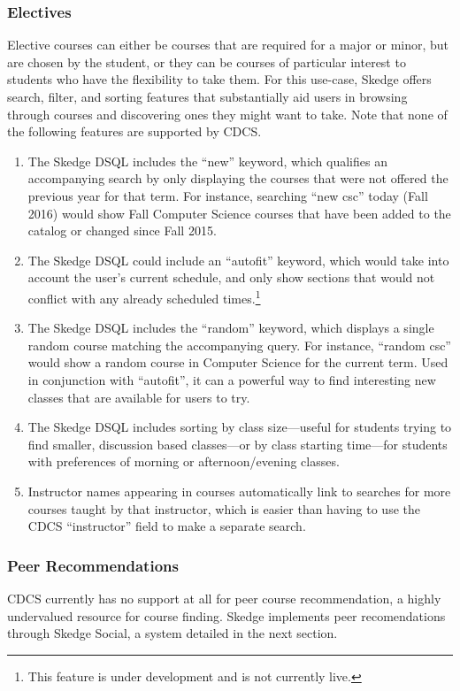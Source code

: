   \subsubsection{Electives}

  Elective courses can either be courses that are required for a major or minor, but are chosen by the student, or they can be courses of particular interest to students who have the flexibility to take them. For this use-case, Skedge offers search, filter, and sorting features that substantially aid users in browsing through courses and discovering ones they might want to take. Note that none of the following features are supported by CDCS.

  \begin{enumerate}

    \item The Skedge DSQL includes the ``new'' keyword, which qualifies an accompanying search by only displaying the courses that were not offered the previous year for that term. For instance, searching ``new csc'' today (Fall 2016) would show Fall Computer Science courses that have been added to the catalog or changed since Fall 2015.
    \item The Skedge DSQL could include an ``autofit'' keyword, which would take into account the user's current schedule, and only show sections that would not conflict with any already scheduled times.\footnote{This feature is under development and is not currently live.}
    \item The Skedge DSQL includes the ``random'' keyword, which displays a single random course matching the accompanying query. For instance, ``random csc'' would show a random course in Computer Science for the current term. Used in conjunction with ``autofit'', it can a powerful way to find interesting new classes that are available for users to try.
    \item The Skedge DSQL includes sorting by class size---useful for students trying to find smaller, discussion based classes---or by class starting time---for students with preferences of morning or afternoon/evening classes.
    \item Instructor names appearing in courses automatically link to searches for more courses taught by that instructor, which is easier than having to use the CDCS ``instructor'' field to make a separate search.

  \end{enumerate}

  \subsubsection{Peer Recommendations}

  CDCS currently has no support at all for peer course recommendation, a highly undervalued resource for course finding. Skedge implements peer recomendations through Skedge Social, a system detailed in the next section.
  